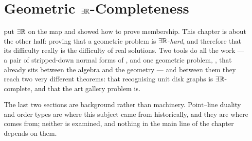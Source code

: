 
\chapter{\texorpdfstring{Geometric $\exists\mathbb{R}$-Completeness}{Geometric exists-R-Completeness}}
\label{ch:geometric-er}

 put $\exists\mathbb{R}$ on the map and showed how to prove membership. This
chapter is about the other half: proving that a geometric problem is
$\exists\mathbb{R}$-\emph{hard}, and therefore that its difficulty really is the difficulty of
real solutions. Two tools do all the work --- a pair of stripped-down normal
forms of \ETR{}, and one geometric problem, , that already
sits between the algebra and the geometry --- and between them they reach two
very different theorems: that recognising unit disk graphs is $\exists\mathbb{R}$-complete,
and that the art gallery problem is.

The last two sections are background rather than machinery. Point--line duality
and order types are where this subject came from historically, and they are
where  comes from; neither is examined, and nothing in the
main line of the chapter depends on them.

\begin{goals}
\end{goals}

